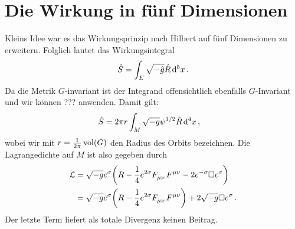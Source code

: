 \section{Die Wirkung in fünf Dimensionen}
Kleins Idee war es das Wirkungsprinzip nach Hilbert auf fünf Dimensionen zu
erweitern. Folglich lautet das Wirkungsintegral
\begin{equation}
\fived{S}=\int_{E}\sqrt{-\fived{g}}\fived{R}\dif{^5}
x\,.
\end{equation}
Da die Metrik $G$-invariant ist der Integrand offensichtlich ebenfalls
$G$-Invariant und wir können ??? anwenden. Damit gilt:
\begin{equation}
\begin{split}
\fived{S}&=2\pi
r\int_{M}\sqrt{-g}\psi^{1/2}\fived{R}\dif{^4}x\,,
\end{split}
\end{equation}
wobei wir mit $r=\frac{1}{2\pi}\operatorname{vol}(G)$ den Radius des Orbits bezeichnen.
Die Lagrangedichte auf $M$ ist also gegeben durch
\begin{equation}
\begin{split}
\mathcal{L}&=\sqrt{-g}e^{\sigma}\left(R-\frac{1}{4}e^{2\sigma}\tensor{F}{_\mu_\nu}\tensor{F}{^\mu^\nu}
-2e^{-\sigma}\square e^{\sigma}\right)\\
&=\sqrt{-g}e^{\sigma}\left(R-\frac{1}{4}e^{2\sigma}\tensor{F}{_\mu_\nu}\tensor{F}{^\mu^\nu}\right)+2\sqrt{-g}\square
e^{\sigma}\,.\label{eq:Lagrange1}
\end{split}
\end{equation}
Der letzte Term liefert als totale Divergenz keinen Beitrag.
